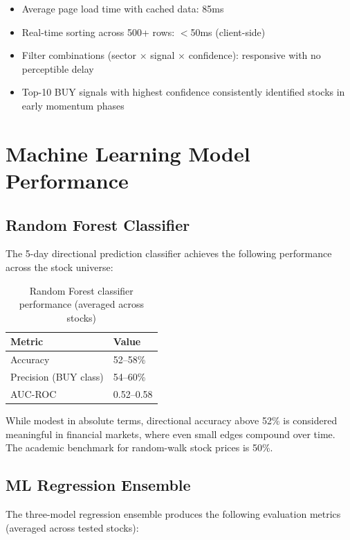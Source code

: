 \documentclass[12pt, a4paper, oneside]{report}
\begin{document}
\begin{itemize}[nosep]
    \item Average page load time with cached data: 85ms
    \item Real-time sorting across 500+ rows: $<$50ms (client-side)
    \item Filter combinations (sector $\times$ signal $\times$ confidence): responsive with no perceptible delay
    \item Top-10 BUY signals with highest confidence consistently identified stocks in early momentum phases
\end{itemize}

\section{Machine Learning Model Performance}
\label{sec:results_ml}

\subsection{Random Forest Classifier}

The 5-day directional prediction classifier achieves the following performance across the stock universe:

\begin{table}[H]
\centering
\caption{Random Forest classifier performance (averaged across stocks)}
\label{tab:rf_performance}
\begin{tabular}{@{}ll@{}}
\toprule
\textbf{Metric} & \textbf{Value} \\
\midrule
Accuracy & 52--58\% \\
Precision (BUY class) & 54--60\% \\
AUC-ROC & 0.52--0.58 \\
\bottomrule
\end{tabular}
\end{table}

While modest in absolute terms, directional accuracy above 52\% is considered meaningful in financial markets, where even small edges compound over time. The academic benchmark for random-walk stock prices is 50\%.

\subsection{ML Regression Ensemble}

The three-model regression ensemble produces the following evaluation metrics (averaged across tested stocks):
\end{document}

